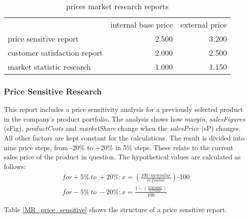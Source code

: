 \begin{table}[ht]
\centering
\begin{tabular}{|l|r|r|}
\hline
                             & internal base price  & external price \\
price sensitive report       & 2.500                & 3.200     \\
customer satisfaction report & 2.000                & 2.500     \\
market statistic research    & 1.000                & 1.150     \\
\hline
\end{tabular}
\caption{prices market research reports}
\label{MR_report_price}
\end{table}

\subsubsection{Price Sensitive Research}
This report includes a price sensitivity analysis for a previously selected product in the company's product portfolio. The analysis shows how \textit{margin}, \textit{salesFigures} (\gls{sFig}), \textit{productCosts} and \textit{marketShare} change when the \textit{salesPrice} (\gls{sP}) changes. All other factors are kept constant for the calculations. The result is divided into nine price steps, from -20\% to +20\% in 5\% steps. These relate to the current sales price of the product in question. The hypothetical values are calculated as follows:
\begin{equation}
    \begin{aligned}
       for +5\% ~to~ +20\%: x = (\frac{100 \cdot new value}{ref value}) \text{-} 100\\
       for -5\% ~to ~-20\%: x = \frac{1-(\frac{new value}{ref value})}{100}
    \end{aligned}
\end{equation}

Table \ref{MR_price_sensitive} shows the structure of a price sensitive report. 

